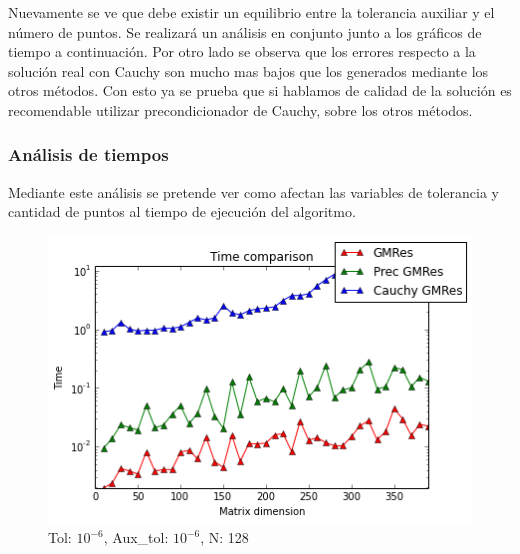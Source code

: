 \documentclass[fleqn]{article}
\begin{document}
Nuevamente se ve que debe existir un equilibrio entre la tolerancia auxiliar y el número de puntos. Se realizará un análisis en conjunto junto a los gráficos de tiempo a continuación. Por otro lado se observa que los errores respecto a la solución real con Cauchy son mucho mas bajos que los generados mediante los otros métodos. Con esto ya se prueba que si hablamos de calidad de la solución es recomendable utilizar precondicionador de Cauchy, sobre los otros métodos.
\newpage
\subsubsection*{Análisis de tiempos}
Mediante este análisis se pretende ver como afectan las variables de tolerancia y cantidad de puntos al tiempo de ejecución del algoritmo.

\begin{figure}[ht]
    \centering
    \includegraphics[scale=0.4]{images/t1.png}
    \caption{Tol: $10^{-6}$, Aux\_tol: $10^{-6}$, N: 128}
    \label{fig:19}
\end{figure}
\end{document}
